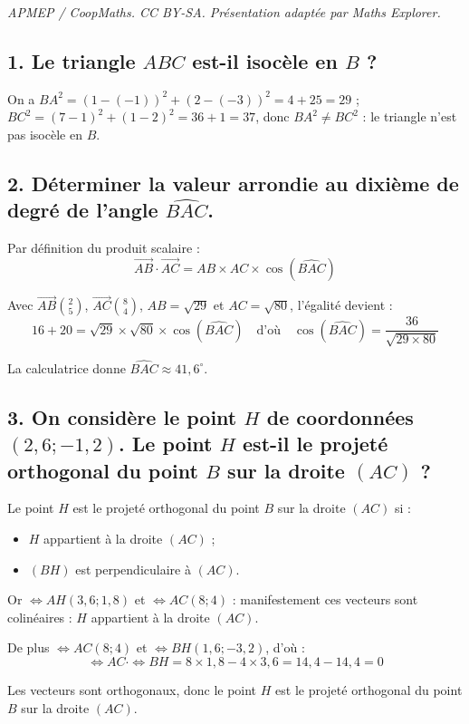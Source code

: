 \documentclass[10pt]{article}
\begin{document}
\noindent\textit{APMEP / CoopMaths. CC BY-SA. Présentation adaptée par Maths Explorer.}\par\medskip
\subsection*{1. Le triangle $ABC$ est-il isocèle en $B$ ?}
On a $BA^2 = (1 - (-1))^2 + (2 - (-3))^2 = 4 + 25 = 29$ ; $BC^2 = (7 - 1)^2 + (1 - 2)^2 = 36 + 1 = 37$, donc $BA^2 \neq BC^2$ : le triangle n'est pas isocèle en $B$.
	
	\subsection*{2. Déterminer la valeur arrondie au dixième de degré de l'angle $\widehat{BAC}$.}
Par définition du produit scalaire :
	\[
	\overrightarrow{AB} \cdot 	\overrightarrow{AC} = AB \times AC \times \cos(\widehat{BAC})
	\]
	
	Avec $	\overrightarrow{AB}\displaystyle\binom{2}{5}$, $	\overrightarrow{AC}\displaystyle\binom{8}{4}$, $AB = \sqrt{29}$ et $AC = \sqrt{80}$, l'égalité devient :
	\[
	16 + 20 = \sqrt{29} \times \sqrt{80} \times \cos(\widehat{BAC}) \quad \text{d'où} \quad \cos(\widehat{BAC}) = \dfrac{36}{\sqrt{29 \times 80}}
	\]
	
	La calculatrice donne $\widehat{BAC} \approx 41,6^\circ$.
	
	\subsection*{3. On considère le point $H$ de coordonnées $(2,6 ; -1,2)$. Le point $H$ est-il le projeté orthogonal du point $B$ sur la droite $(AC)$ ?}
	
	Le point $H$ est le projeté orthogonal du point $B$ sur la droite $(AC)$ si :
	\begin{itemize}
		\item $H$ appartient à la droite $(AC)$ ;
		\item $(BH)$ est perpendiculaire à $(AC)$.
	\end{itemize}
	
	Or $\iff{AH}(3,6 ; 1,8)$ et $\iff{AC}(8 ; 4)$ : manifestement ces vecteurs sont colinéaires : $H$ appartient à la droite $(AC)$.
	
	De plus $\iff{AC}(8 ; 4)$ et $\iff{BH}(1,6 ; -3,2)$, d'où :
	\[
	\iff{AC} \cdot \iff{BH} = 8 \times 1,8 - 4 \times 3,6 = 14,4 - 14,4 = 0
	\]
	
	Les vecteurs sont orthogonaux, donc le point $H$ est le projeté orthogonal du point $B$ sur la droite $(AC)$.
\end{document}
